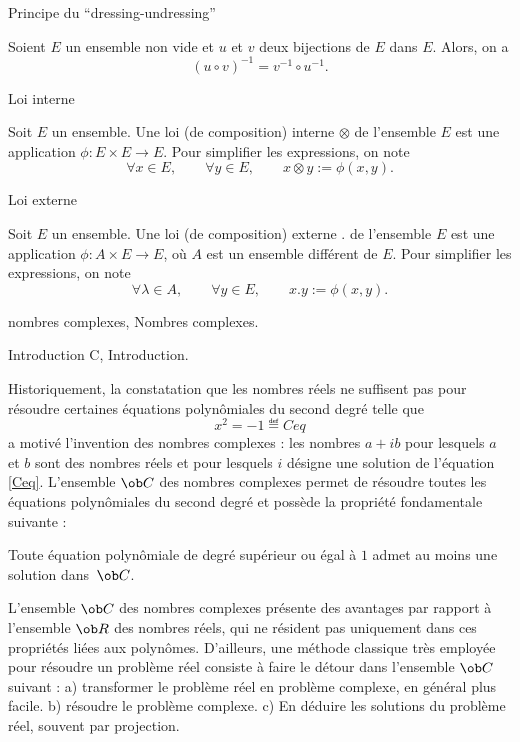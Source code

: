 \Concept Principe du ``dressing-undressing''

Soient $E$ un ensemble non vide et $u$ et $v$ deux bijections de $E$ dans $E$. Alors, on a 
$$
(u\circ v)^{-1}=v^{-1}\circ u^{-1}.
$$


\Concept Loi interne

Soit $E$ un ensemble. Une loi (de composition) interne $\otimes$ de l'ensemble $E$ est une application $\phi:E\times E\to E$. 
Pour simplifier les expressions, on note 
$$
\forall x\in E, \qquad\forall y\in E, \qquad x\otimes y:=\phi(x,y).
$$


\Concept Loi externe

Soit $E$ un ensemble. Une loi (de composition) externe $.$ de l'ensemble $E$ est une application $\phi:A\times E\to E$, où $A$ est un ensemble différent de $E$. 
Pour simplifier les expressions, on note 
$$
\forall \lambda\in A, \qquad\forall y\in E, \qquad x.y:=\phi(x,y).
$$






\Chapter nombres complexes, Nombres complexes.

\Section Introduction C, Introduction. 

Historiquement, la constatation que les nombres réels ne suffisent pas pour résoudre certaines équations polynômiales 
du second degré telle que
$$
x^2=-1
\eqdef{Ceq}
$$ 
a motivé l'invention des nombres complexes : les nombres $a+ib$ pour lesquels $a$ et $b$ sont des nombres réels 
et pour lesquels $i$ désigne une solution de l'équation \eqref{Ceq}. 
\bigskip
L'ensemble $\ob C$ des nombres complexes permet de résoudre toutes les équations po\-ly\-nô\-mia\-les 
du second degré et possède la propriété fondamentale suivante : 

\Theoreme [Index=Theoreme@Théorème!de d'Alembert;Title=Théorème de d'Alembert-Gauss] 
Toute équation polynômiale de degré supérieur ou égal à $1$ admet au moins une solution dans~$\ob C$. 

L'ensemble $\ob C$ des nombres complexes présente des avantages par rapport à l'ensemble $\ob R$ des nombres réels, 
qui ne résident pas uniquement dans ces propriétés liées aux polynômes. D'ailleurs, une méthode classique très employée pour résoudre un problème réel consiste à faire le détour dans l'ensemble $\ob C$ suivant : \medskip
 \noindent
a) transformer le problème réel en problème complexe, en général plus facile. 
\smallskip\noindent
b) résoudre le problème complexe. 
\smallskip\noindent
c) En déduire les solutions du problème réel, souvent par projection. 
\bigskip

